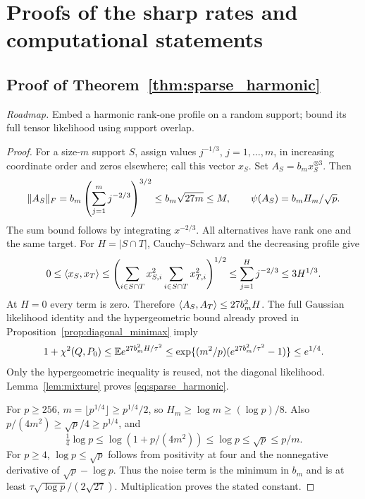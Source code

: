 
\section{Proofs of the sharp rates and computational statements}\label{app:gap_proofs}

\subsection{Proof of Theorem~\ref{thm:sparse_harmonic}}
\noindent\emph{Roadmap.} Embed a harmonic rank-one profile on a random support; bound its full tensor likelihood using support overlap.
\begin{proof}
For a size-$m$ support $S$, assign values $j^{-1/3}$, $j=1,\ldots,m$, in increasing coordinate order and zeros elsewhere; call this vector $x_S$. Set $A_S=b_mx_S^{\otimes3}$. Then
\[
 \lVert A_S\rVert_F=b_m\left(\sum_{j=1}^m j^{-2/3}\right)^{3/2}
 \le b_m\sqrt{27m}\le M,\qquad \psi(A_S)=b_mH_m/\sqrt p.
\]
The sum bound follows by integrating $x^{-2/3}$.
All alternatives have rank one and the same target.
For $H=|S\cap T|$, Cauchy--Schwarz and the decreasing profile give
\[
 0\le\langle x_S,x_T\rangle
 \le\left(\sum_{i\in S\cap T}x_{S,i}^2
           \sum_{i\in S\cap T}x_{T,i}^2\right)^{1/2}
 \le\sum_{j=1}^Hj^{-2/3}\le3H^{1/3}.
\]
At $H=0$ every term is zero. Therefore
$\langle A_S,A_T\rangle\le27b_m^2H$.
The full Gaussian likelihood identity and the hypergeometric bound already proved in Proposition~\ref{prop:diagonal_minimax} imply
\[
 1+\chi^2(Q,P_0)\le\mathbb E e^{27b_m^2H/\tau^2}
 \le\exp\{(m^2/p)(e^{27b_m^2/\tau^2}-1)\}\le e^{1/4}.
\]
Only the hypergeometric inequality is reused, not the diagonal likelihood.
Lemma~\ref{lem:mixture} proves \eqref{eq:sparse_harmonic}.

For $p\ge256$, $m=\lfloor p^{1/4}\rfloor\ge p^{1/4}/2$,
so $H_m\ge\log m\ge(\log p)/8$.
Also $p/(4m^2)\ge\sqrt p/4\ge p^{1/4}$, and
\[
 \tfrac14\log p\le\log(1+p/(4m^2))\le\log p\le\sqrt p\le p/m.
\]
For $p\ge4$, $\log p\le\sqrt p$ follows from positivity at four and the nonnegative derivative of $\sqrt p-\log p$.
Thus the noise term is the minimum in $b_m$ and is at least
$\tau\sqrt{\log p}/(2\sqrt{27})$. Multiplication proves the stated constant.
\end{proof}

